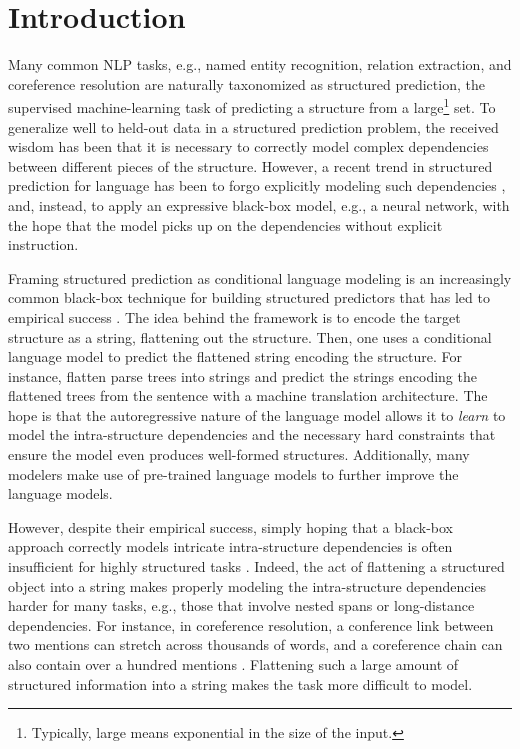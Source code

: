\documentclass[11pt]{article}
\begin{document}
\section{Introduction}
Many common NLP tasks, e.g., named entity recognition, relation extraction, and coreference resolution are naturally taxonomized as structured prediction, the supervised machine-learning task of predicting
a structure from a large\footnote{Typically, large means exponential in the size of the input.} set.
To generalize well to held-out data in a structured prediction problem, the received wisdom has been that it is necessary to correctly model complex dependencies between different pieces of the structure.
However, a recent trend in structured prediction for language has been to forgo explicitly modeling such dependencies \citep[\textit{inter alia}]{ma-hovy-2016-end, lee-etal-2017-end, he-etal-2017-deep}, and, instead, to apply an expressive black-box model, e.g., a neural network, with the hope that the model picks up on the dependencies without explicit instruction.


Framing structured prediction as conditional language modeling is an increasingly common black-box technique for building structured predictors that has led to empirical success \citep[\emph{inter alia}]{NIPS2015_277281aa, raffel-t5,athiwaratkun-etal-2020-augmented,decao2020autoregressive,tanl}. 
The idea behind the framework is to encode the target structure as a string, flattening out the structure.
Then, one uses a conditional language model to predict the flattened string encoding the structure.
For instance, \citet{NIPS2015_277281aa} flatten parse trees into strings and predict the strings encoding the flattened trees from the sentence with a machine translation architecture.
The hope is that the autoregressive nature of the language model allows it to \emph{learn} to model the intra-structure dependencies and the necessary hard constraints that ensure the model even produces well-formed structures.
Additionally, many modelers make use of pre-trained language models \cite{lewis,raffel-t5} to further improve the language models.

However, despite their empirical success, simply hoping that a black-box approach correctly models intricate intra-structure dependencies is often insufficient for highly structured tasks \citep[\S1]{tanl}.
Indeed, the act of flattening a structured object into a string
makes properly modeling the intra-structure dependencies harder for many tasks, e.g., those that involve nested spans or long-distance dependencies. 
For instance, in coreference resolution, a conference link between two mentions can stretch across thousands of words, and a coreference chain can also contain over a hundred mentions \citep{pradhan-etal-2012-conll}.
Flattening such a large amount of structured information into a string makes the task more difficult to model.
\end{document}
